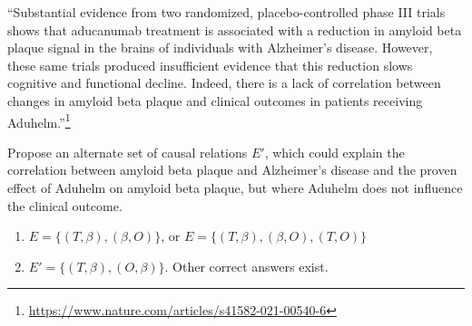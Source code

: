 \begin{enumerate}[label=1.\arabic*]
\begin{enumerate}
        ``Substantial evidence from two randomized, placebo-controlled phase III trials shows that aducanumab treatment is associated with a reduction in amyloid beta plaque signal in the brains of individuals with Alzheimer's disease. However, these same trials produced insufficient evidence that this reduction slows cognitive and functional decline. Indeed, there is a lack of correlation between changes in amyloid beta plaque and clinical outcomes in patients receiving Aduhelm.''\footnote{\url{https://www.nature.com/articles/s41582-021-00540-6}}

        Propose an alternate set of causal relations $E'$, which could explain the correlation between amyloid beta plaque and Alzheimer's disease and the proven effect of Aduhelm on amyloid beta plaque, but where Aduhelm does not influence the clinical outcome.
    \end{enumerate}

    \begin{gradedsolution}
        \begin{enumerate}
            \item {} $E = \{(T, \beta), (\beta, O)\}$, or $E = \{(T, \beta), (\beta, O), (T, O)\}$
            \item {} $E' = \{(T, \beta), (O, \beta)\}$. Other correct answers exist.
        \end{enumerate}
    \end{gradedsolution}

\end{enumerate}

